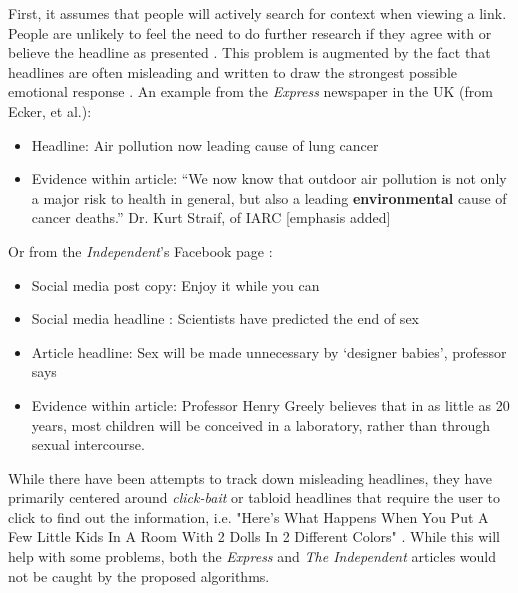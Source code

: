 \documentclass[preprint,review,12pt]{elsarticle}
\begin{document}
 First, it assumes that people will actively search for context when viewing a link. People are unlikely to feel the need to do further research if they agree with or believe the headline as presented \cite{nyhan2010corrections}. This problem is augmented by the fact that headlines are often misleading and written to draw the strongest possible emotional response \cite{chesney2017incongruent,ecker2014effects,bell1984good,molek2013towards,kilgo2018new,vettehen2008explaining}. An example from the \textit{Express} newspaper in the UK (from Ecker, et al.):
 \begin{itemize}
 \item Headline: Air pollution now leading cause of lung cancer
\item Evidence within article: “We now know that outdoor air pollution is not only a major risk to health in general, but also a leading \textbf{environmental} cause of cancer deaths.” Dr. Kurt Straif, of IARC [emphasis added]
 \end{itemize}
 
 Or from the \textit{Independent}'s Facebook page \cite{chesney2017incongruent}:
 \begin{itemize}
\item Social media post copy: Enjoy it while you
can
\item Social media headline \footnotemark[1]: Scientists have predicted the end of sex
\item Article headline\footnotemark[2]: Sex will be made unnecessary by ‘designer babies’, professor says
\item Evidence within article: Professor Henry Greely believes that in as little as 20 years, most children will be conceived in a laboratory, rather than through sexual intercourse.
 \end{itemize}
 
 While there have been attempts to track down misleading headlines, they have primarily centered around \textit{click-bait} or tabloid headlines \cite{chen2015misleading,chakraborty2016stop} that require the user to click to find out the information, i.e. "Here’s What Happens When You Put A Few Little Kids In A Room With 2 Dolls In 2 Different Colors" \cite{chen2015misleading}. While this will help with some problems, both the \textit{Express} and \textit{The Independent} articles would not be caught by the proposed algorithms. 
 
\end{document}
